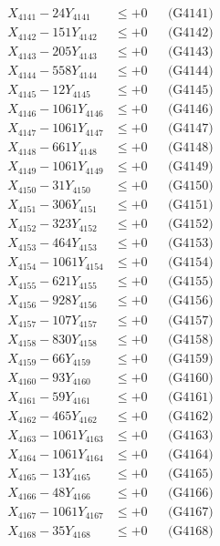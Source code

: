 \documentclass[a4paper,10pt]{article}
\begin{document}
{\begin{align}
\allowbreak
X_{4141} - 24Y_{4141} &\leq +0 && \text{(G4141)} \\
X_{4142} - 151Y_{4142} &\leq +0 && \text{(G4142)} \\
X_{4143} - 205Y_{4143} &\leq +0 && \text{(G4143)} \\
X_{4144} - 558Y_{4144} &\leq +0 && \text{(G4144)} \\
X_{4145} - 12Y_{4145} &\leq +0 && \text{(G4145)} \\
X_{4146} - 1061Y_{4146} &\leq +0 && \text{(G4146)} \\
X_{4147} - 1061Y_{4147} &\leq +0 && \text{(G4147)} \\
X_{4148} - 661Y_{4148} &\leq +0 && \text{(G4148)} \\
X_{4149} - 1061Y_{4149} &\leq +0 && \text{(G4149)} \\
X_{4150} - 31Y_{4150} &\leq +0 && \text{(G4150)} \\
\allowbreak
X_{4151} - 306Y_{4151} &\leq +0 && \text{(G4151)} \\
X_{4152} - 323Y_{4152} &\leq +0 && \text{(G4152)} \\
X_{4153} - 464Y_{4153} &\leq +0 && \text{(G4153)} \\
X_{4154} - 1061Y_{4154} &\leq +0 && \text{(G4154)} \\
X_{4155} - 621Y_{4155} &\leq +0 && \text{(G4155)} \\
X_{4156} - 928Y_{4156} &\leq +0 && \text{(G4156)} \\
X_{4157} - 107Y_{4157} &\leq +0 && \text{(G4157)} \\
X_{4158} - 830Y_{4158} &\leq +0 && \text{(G4158)} \\
X_{4159} - 66Y_{4159} &\leq +0 && \text{(G4159)} \\
X_{4160} - 93Y_{4160} &\leq +0 && \text{(G4160)} \\
\allowbreak
X_{4161} - 59Y_{4161} &\leq +0 && \text{(G4161)} \\
X_{4162} - 465Y_{4162} &\leq +0 && \text{(G4162)} \\
X_{4163} - 1061Y_{4163} &\leq +0 && \text{(G4163)} \\
X_{4164} - 1061Y_{4164} &\leq +0 && \text{(G4164)} \\
X_{4165} - 13Y_{4165} &\leq +0 && \text{(G4165)} \\
X_{4166} - 48Y_{4166} &\leq +0 && \text{(G4166)} \\
X_{4167} - 1061Y_{4167} &\leq +0 && \text{(G4167)} \\
X_{4168} - 35Y_{4168} &\leq +0 && \text{(G4168)} \\

\end{align}}
\end{document}
